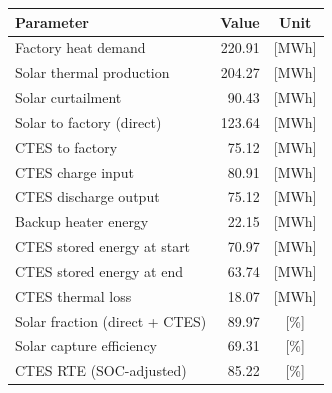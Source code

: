 \renewcommand{\arraystretch}{1.2}
\begin{table}[h]
\centering
\begin{tabular}{l|r c}
\hline
Parameter & Value & Unit \\
\hline
Factory heat demand & 220.91 & [MWh] \\
Solar thermal production & 204.27 & [MWh] \\
Solar curtailment & 90.43 & [MWh] \\
Solar to factory (direct) & 123.64 & [MWh] \\
CTES to factory & 75.12 & [MWh] \\
CTES charge input & 80.91 & [MWh] \\
CTES discharge output & 75.12 & [MWh] \\
Backup heater energy & 22.15 & [MWh] \\
CTES stored energy at start & 70.97 & [MWh] \\
CTES stored energy at end & 63.74 & [MWh] \\
CTES thermal loss & 18.07 & [MWh] \\
\hline
Solar fraction (direct + CTES) & 89.97 & [\%] \\
Solar capture efficiency & 69.31 & [\%] \\
CTES RTE (SOC-adjusted) & 85.22 & [\%] \\
\hline
\end{tabular}
\end{table}
